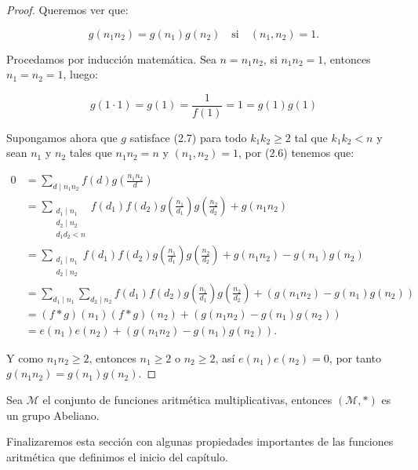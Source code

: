 \begin{proof}
Queremos ver que:

\begin{equation}
g(n_1n_2)=g(n_1)g(n_2) \quad \text{si} \quad (n_1,n_2)=1.
\end{equation}

Procedamos por inducción matemática. Sea $n=n_1 n_2$, si $n_1 n_2=1$, entonces $n_1=n_2=1$, luego:

$$g(1\cdot 1)=g(1)=\dfrac{1}{f(1)}=1=g(1)g(1)$$

Supongamos ahora que $g$ satisface (2.7) para todo $k_1k_2\geq 2$ tal que $k_1k_2<n$ y sean $n_1$ y $n_2$ tales que $n_1n_2=n$ y $(n_1,n_2)=1$, por (2.6) tenemos que:

$$
\begin{aligned}
0 & =\sum_{d \mid n_1 n_2} f(d) g\left(\frac{n_1n_2}{d}\right) \\
&=\sum_{\substack{d_1 \mid n_1 \\
d_2\mid n_2\\ d_1d_2<n}} f(d_1)f(d_2) g \left( \frac{n_1}{d_1} \right)g \left( \frac{n_2}{d_2} \right)+ g(n_1n_2)\\
&=\sum_{\substack{d_1 \mid n_1 \\
d_2\mid n_2}} f(d_1)f(d_2) g \left( \frac{n_1}{d_1} \right)g \left( \frac{n_2}{d_2} \right)+ g(n_1n_2)-g(n_1)g(n_2)\\
& =\sum_{d_1 \mid n_1} \sum_{d_2 \mid n_2} f\left(d_1\right) f\left(d_2\right) g\left(\frac{n_1}{d_1}\right) g\left(\frac{n_2}{d_2}\right)+\left(g\left(n_1 n_2\right)-g\left(n_1\right) g\left(n_2\right)\right) \\
& =(f * g)\left(n_1\right)(f * g)\left(n_2\right)+\left(g\left(n_1 n_2\right)-g\left(n_1\right) g\left(n_2\right)\right) \\
& =e\left(n_1\right) e\left(n_2\right)+\left(g\left(n_1 n_2\right)-g\left(n_1\right) g\left(n_2\right)\right).
\end{aligned}
$$

Y como $n_1n_2\geq 2$, entonces $n_1\geq 2$ o $n_2\geq 2$, así $e(n_1)e(n_2)=0$, por tanto $g(n_1n_2)=g(n_1)g(n_2)$.
\end{proof}

\begin{corollary}
Sea $\mathcal{M}$ el conjunto de funciones aritmética multiplicativas, entonces $(\mathcal{M},*)$ es un grupo Abeliano.
\end{corollary}

Finalizaremos esta sección con algunas propiedades importantes de las funciones aritmética que definimos el inicio del capítulo.

